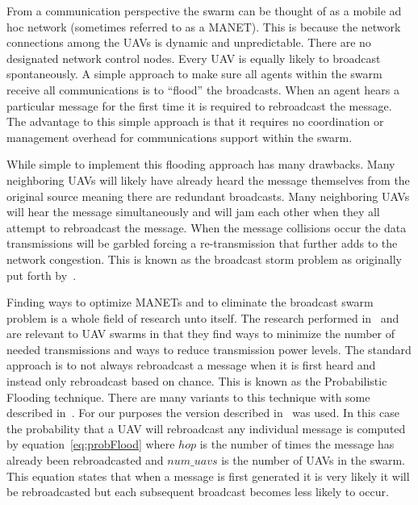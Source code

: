 From a communication perspective the swarm can be thought of as a mobile ad hoc network (sometimes referred to as a MANET).  This is because the network connections among the UAVs is dynamic and unpredictable.  There are no designated network control nodes.  Every UAV is equally likely to broadcast spontaneously.  A simple approach to make sure all agents within the swarm receive all communications is to ``flood'' the broadcasts.  When an agent hears a particular message for the first time it is required to rebroadcast the message.  The advantage to this simple approach is that it requires no coordination or management overhead for communications support within the swarm.

While simple to implement this flooding approach has many drawbacks.  Many neighboring UAVs will likely have already heard the message themselves from the original source meaning there are redundant broadcasts.  Many neighboring UAVs will hear the message simultaneously and will jam each other when they all attempt to rebroadcast the message.  When the message collisions occur the data transmissions will be garbled forcing a re-transmission that further adds to the network congestion.  This is known as the broadcast storm problem as originally put forth by~\cite{bstorm}.

Finding ways to optimize MANETs and to eliminate the broadcast swarm problem is a whole field of research unto itself.  The research performed in~\cite{epidemicManets} and ~\cite{analysisOptNodeDen} are relevant to UAV swarms in that they find ways to minimize the number of needed transmissions and ways to reduce transmission power levels.  The standard approach is to not always rebroadcast a message when it is first heard and instead only rebroadcast based on chance.  This is known as the Probabilistic Flooding technique.  There are many variants to this technique with some described in~\cite{probFloodVariants}.  For our purposes the version described in~\cite{simpleProbFlood} was used.  In this case the probability that a UAV will rebroadcast any individual message is computed by equation~\ref{eq:probFlood} where $hop$ is the number of times the message has already been rebroadcasted and $num\_uavs$ is the number of UAVs in the swarm.  This equation states that when a message is first generated it is very likely it will be rebroadcasted but each subsequent broadcast becomes less likely to occur.

